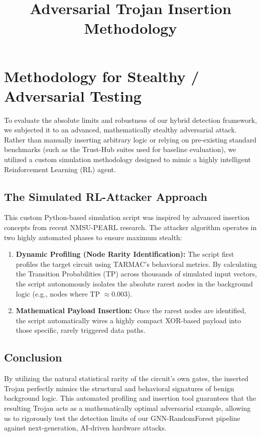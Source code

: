 \documentclass[12pt]{article}
\title{\textbf{Adversarial Trojan Insertion Methodology}}
\author{}
\date{}
\begin{document}
\maketitle

\section*{Methodology for Stealthy / Adversarial Testing}

To evaluate the absolute limits and robustness of our hybrid detection framework, we subjected it to an advanced, mathematically stealthy adversarial attack. Rather than manually inserting arbitrary logic or relying on pre-existing standard benchmarks (such as the Trust-Hub suites used for baseline evaluation), we utilized a custom simulation methodology designed to mimic a highly intelligent Reinforcement Learning (RL) agent.

\subsection*{The Simulated RL-Attacker Approach}

This custom Python-based simulation script was inspired by advanced insertion concepts from recent NMSU-PEARL research. The attacker algorithm operates in two highly automated phases to ensure maximum stealth:

\begin{enumerate}
    \item \textbf{Dynamic Profiling (Node Rarity Identification):} The script first profiles the target circuit using TARMAC's behavioral metrics. By calculating the Transition Probabilities (TP) across thousands of simulated input vectors, the script autonomously isolates the absolute rarest nodes in the background logic (e.g., nodes where TP $\approx 0.003$).
    
    \item \textbf{Mathematical Payload Insertion:} Once the rarest nodes are identified, the script automatically wires a highly compact XOR-based payload into those specific, rarely triggered data paths. 
\end{enumerate}

\subsection*{Conclusion}

By utilizing the natural statistical rarity of the circuit's own gates, the inserted Trojan perfectly mimics the structural and behavioral signatures of benign background logic. This automated profiling and insertion tool guarantees that the resulting Trojan acts as a mathematically optimal adversarial example, allowing us to rigorously test the detection limits of our GNN-RandomForest pipeline against next-generation, AI-driven hardware attacks.
\end{document}
